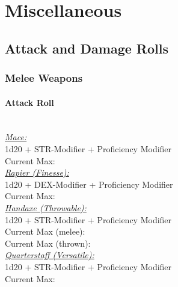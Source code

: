 \documentclass[letterpaper,openany,oneside,twocolumn]{book}
\begin{document}
\vfill\eject
\section*{Miscellaneous}
\subsection*{Attack and Damage Rolls}
\subsubsection*{Melee Weapons}
\paragraph*{Attack Roll}\hfill\\
\underline{\textit{Mace:}}\\
1d20 + STR-Modifier + Proficiency Modifier\\
\indent Current Max: 
\\
\underline{\textit{Rapier (Finesse):}}\\
1d20 + DEX-Modifier + Proficiency Modifier\\
\indent Current Max: 
\\
\underline{\textit{Handaxe (Throwable):}}\\
1d20 + STR-Modifier + Proficiency Modifier\\
\indent Current Max (melee): \\
\indent Current Max (thrown): 
\\
\underline{\textit{Quarterstaff (Versatile):}}\\
1d20 + STR-Modifier + Proficiency Modifier\\
\indent Current Max: 
\end{document}
